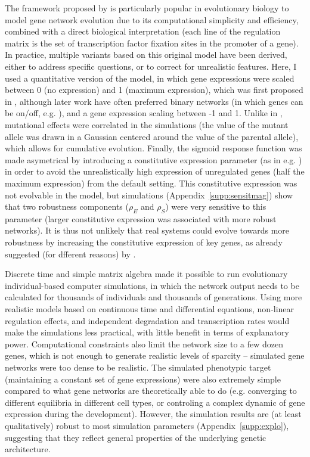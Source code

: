 \documentclass[10pt,a4paper]{article}
\newcommand{\stability}{{\rho_S}}
\newcommand{\earlyenv}{{\rho_E}}
\newcommand{\SupMat}{Appendix~}
\begin{document}
The framework proposed by \citet{Wag94} is particularly popular in evolutionary biology to model gene network evolution due to its computational simplicity and efficiency, combined with a direct biological interpretation (each line of the regulation matrix is the set of transcription factor fixation sites in the promoter of a gene). In practice, multiple variants based on this original model have been derived, either to address specific questions, or to correct for unrealistic features. Here, I used a quantitative version of the model, in which gene expressions were scaled between 0 (no expression) and 1 (maximum expression), which was first proposed in \citet{Wag94}, although later work have often preferred binary networks (in which genes can be on/off, e.g. \citealp{Wag96,CMW07}), and a gene expression scaling between -1 and 1. Unlike in \citet{Wag96, SB02}, mutational effects were correlated in the simulations (the value of the mutant allele was drawn in a Gaussian centered around the value of the parental allele), which allows for cumulative evolution. Finally, the sigmoid response function was made asymetrical by introducing a constitutive expression parameter (as in e.g. \citealp{RL16}) in order to avoid the unrealistically high expression of unregulated genes (half the maximum expression) from the default setting. This constitutive expression was not evolvable in the model, but simulations (\SupMat \ref{supp:sensitmag}) show that two robustness components ($\earlyenv$ and $\stability$) were very sensitive to this parameter (larger constitutive expression was associated with more robust networks). It is thus not unlikely that real systems could evolve towards more robustness by increasing the constitutive expression of key genes, as already suggested (for dfferent reasons) by \citealp{DW15}. 

Discrete time and simple matrix algebra made it possible to run evolutionary individual-based computer simulations, in which the network output needs to be calculated for thousands of individuals and thousands of generations. Using more realistic models based on continuous time and differential equations, non-linear regulation effects, and independent degradation and transcription rates would make the simulations less practical, with little benefit in terms of explanatory power. Computational constraints also limit the network size to a few dozen genes, which is not enough to generate realistic levels of sparcity -- simulated gene networks were too dense to be realistic. The simulated phenotypic target (maintaining a constant set of gene expressions) were also extremely simple compared to what gene networks are theoretically able to do (e.g. converging to different equilibria in different cell types, or controling a complex dynamic of gene expression during the development). However, the simulation results are (at least qualitatively) robust to most simulation parameters (\SupMat \ref{supp:explo}), suggesting that they reflect general properties of the underlying genetic architecture. 
\end{document}
